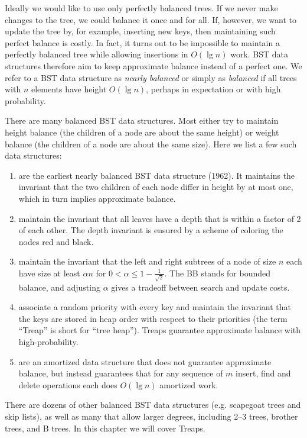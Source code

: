 Ideally we would like to use only perfectly balanced trees.  
%
If we never make changes to the tree, we could balance it
once and for all.
%
If, however, we want to update the tree by, for example, inserting new
keys, then maintaining such perfect balance is costly.  
%
In fact, it turns out to be impossible to maintain a perfectly
balanced tree while allowing insertions in $O(\lg n)$ work.  
%
BST data structures therefore aim to keep approximate balance instead
of a perfect one.  We refer to a BST data structure as {\em nearly
  balanced} or simply as {\em balanced} if all trees with $n$ elements
have height $O(\lg n)$, perhaps in expectation or with high
probability.

There are many balanced BST data structures.  Most either try to
maintain height balance (the children of a node are about the same
height) or weight balance (the children of a node are about the same
size).  Here we list a few such data structures:

\begin{enumerate}
\item {} are the earliest nearly balanced BST data
  structure (1962).  It maintains the invariant that the two children
  of each node differ in height by at most one, which in turn implies
  approximate balance.

\item {} maintain the invariant that all leaves
  have a depth that is within a factor of 2 of each other.  The depth
  invariant is ensured by a scheme of coloring the nodes red and
  black.

\item {} maintain the
  invariant that the left and right subtrees of a node of size $n$
  each have size at least $\alpha n$ for $0 < \alpha \leq
  1 - \frac{1}{\sqrt{2}}$.  The BB stands for bounded balance, and adjusting
  $\alpha$ gives a tradeoff between search and update costs.

\item {} associate a random priority with every key and
  maintain the invariant that the keys are stored in heap order with
  respect to their priorities (the term ``Treap'' is short for ``tree
  heap'').  Treaps guarantee approximate balance with
  high-probability.

\item {} are an amortized data structure that does not
  guarantee approximate balance, but instead guarantees that for any sequence
  of $m$ insert, find and delete operations each does $O(\lg n)$
  amortized work.
\end{enumerate}
There are dozens of other balanced BST data structures (e.g. scapegoat
trees and skip lists), as well as many that allow larger degrees,
including 2--3 trees, brother trees, and B trees.  
%
In this chapter we will cover Treaps.

